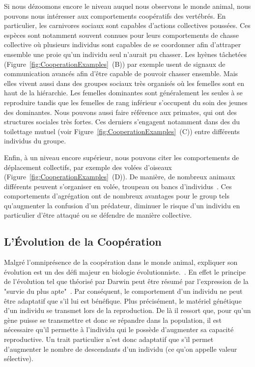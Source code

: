 		Si nous dézoomons encore le niveau auquel nous observons le monde animal, nous pouvons nous intéresser aux comportements coopératifs des vertébrés. En particulier, les carnivores sociaux sont capables d'actions collectives poussées. Ces espèces sont notamment souvent connues pour leurs comportements de chasse collective où plusieurs individus sont capables de se coordonner afin d'attraper ensemble une proie qu'un individu seul n'aurait pu chasser. Les hyènes tâchetées (Figure~\ref{fig:CooperationExamples}~(B)) par exemple usent de signaux de communication avancés afin d'être capable de pouvoir chasser ensemble. Mais elles vivent aussi dans des groupes sociaux très organisés où les femelles sont en haut de la hiérarchie. Les femelles dominantes sont généralement les seules à se reproduire tandis que les femelles de rang inférieur s'occupent du soin des jeunes des dominantes. Nous pouvons aussi faire référence aux primates, qui ont des structures sociales très fortes. Ces derniers s'engagent notamment dans des du toilettage mutuel (voir Figure~\ref{fig:CooperationExamples}~(C)) entre différents individus du groupe.

		Enfin, à un niveau encore supérieur, nous pouvons citer les comportements de déplacement collectifs, par exemple des volées d'oiseaux (Figure~\ref{fig:CooperationExamples}~(D)). De manière, de nombreux animaux différents peuvent s'organiser en volée, troupeau ou bancs d'individus~\parencite{Couzin2002, Counzin2003}. Ces comportements d'agrégation ont de nombreux avantages pour le group tels qu'augmenter la confusion d'un prédateur, diminuer le risque d'un individu en particulier d'être attaqué ou se défendre de manière collective.


	\subsection{L'Évolution de la Coopération}

		Malgré l'omniprésence de la coopération dans le monde animal, expliquer son évolution est un des défi majeur en biologie évolutionniste.~\parencite{Hamilton1964, Dugatkin2002, West2011a}. En effet le principe de l'évolution tel que théorisé par Darwin peut être résumé par l'expression de la "survie du plus apte"~\parencite{Darwin1859}. Par conséquent, le comportement d'un individu ne peut être adaptatif que s'il lui est bénéfique. Plus précisément, le matériel génétique d'un individu se transmet lors de la reproduction. De là il ressort que, pour qu'un gène puisse se transmettre et donc se répandre dans la population, il est nécessaire qu'il permette à l'individu qui le possède d'augmenter sa capacité reproductive. Un trait particulier n'est donc adaptatif que s'il permet d'augmenter le nombre de descendants d'un individu (ce qu'on appelle valeur sélective).

